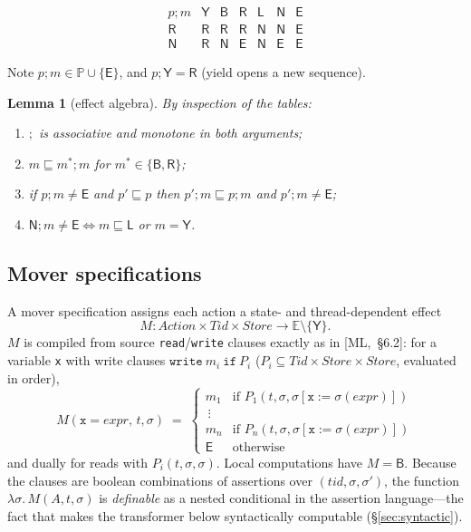 \documentclass[11pt]{article}
\theoremstyle{plain}
\newtheorem{lemma}{Lemma}
\theoremstyle{plain}
\theoremstyle{definition}
\newcommand{\Tid}{\mathit{Tid}}
\newcommand{\Store}{\mathit{Store}}
\newcommand{\Action}{\mathit{Action}}
\newcommand{\Effect}{\mathbb{E}}
\newcommand{\Phase}{\mathbb{P}}
\newcommand{\MY}{\mathsf{Y}}
\newcommand{\MB}{\mathsf{B}}
\newcommand{\MR}{\mathsf{R}}
\newcommand{\ML}{\mathsf{L}}
\newcommand{\MN}{\mathsf{N}}
\newcommand{\ME}{\mathsf{E}}
\newcommand{\sq}{\sqsubseteq}
\newcommand{\code}[1]{\texttt{#1}}
\begin{document}
\[
\begin{array}{c|cccccc}
p;m & \MY & \MB & \MR & \ML & \MN & \ME\\\hline
\MR & \MR & \MR & \MR & \MN & \MN & \ME\\
\MN & \MR & \MN & \ME & \MN & \ME & \ME
\end{array}
\]

Note $p;m\in\Phase\cup\{\ME\}$, and $p;\MY=\MR$ (yield opens a new sequence).

\begin{lemma}[effect algebra]\label{lem:algebra}
By inspection of the tables:
\begin{enumerate}[label=(\alph*),leftmargin=2.2em]
\item $;$ is associative and monotone in both arguments;
\item $m\sq m^{*};m$ for $m^{*}\in\{\MB,\MR\}$;
\item if $p;m\neq\ME$ and $p'\sq p$ then $p';m\sq p;m$ and $p';m\neq\ME$;
\item $\MN;m\neq\ME \iff m\sq\ML$ or $m = \MY$.
\end{enumerate}
\end{lemma}

\subsection{Mover specifications}\label{sec:moverspec}

A mover specification assigns each action a state- and thread-dependent effect
\[
M : \Action\times\Tid\times\Store \to \Effect\setminus\{\MY\}.
\]
$M$ is compiled from source \code{read}/\code{write} clauses exactly as in
[ML,~\S6.2]: for a variable \code{x} with write clauses
$\code{write}\ m_i\ \code{if}\ P_i$
($P_i\subseteq\Tid\times\Store\times\Store$, evaluated in order),
\[
M(\code{x}\!=\!expr,\,t,\sigma) \;=\;
\begin{cases}
m_1 & \text{if } P_1(t,\sigma,\sigma[\code{x}:=\sigma(expr)])\\
\ \vdots\\
m_n & \text{if } P_n(t,\sigma,\sigma[\code{x}:=\sigma(expr)])\\
\ME & \text{otherwise}
\end{cases}
\]
and dually for reads with $P_i(t,\sigma,\sigma)$. Local computations have
$M=\MB$. Because the clauses are boolean combinations of assertions over
$(\mathit{tid},\sigma,\sigma')$, the function $\lambda\sigma.\,M(A,t,\sigma)$ is
\emph{definable} as a nested conditional in the assertion language---the fact that
makes the transformer below syntactically computable (\S\ref{sec:syntactic}).
\end{document}
